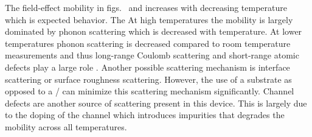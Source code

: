 \noindent The field-effect mobility in figs.~ and  increases with decreasing temperature which is expected behavior. The  At high temperatures the mobility is largely dominated by phonon scattering which is decreased with temperature. At lower temperatures phonon scattering is decreased compared to room temperature measurements and thus long-range Coulomb scattering and short-range atomic defects play a large role \cite{Ando_RevModPhys1982}. Another possible scattering mechanism is interface scattering or surface roughness scattering. However, the use of a \hbn substrate as opposed to a / can minimize this scattering mechanism significantly. Channel defects are another source of scattering present in this device. This is largely due to the doping of the  channel which introduces impurities that degrades the mobility across all temperatures. \\ \\

